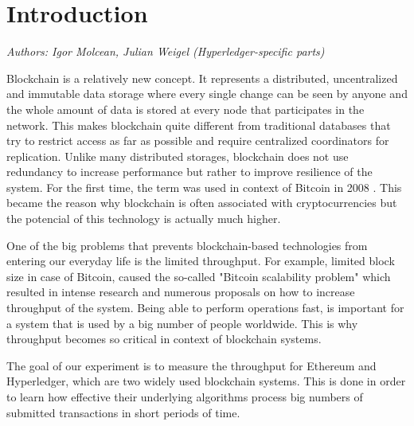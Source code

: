 \section{Introduction}
\textit{Authors: Igor Molcean, Julian Weigel (Hyperledger-specific parts)}

Blockchain is a relatively new concept. It represents a distributed, uncentralized and immutable data storage where every single change can be seen by anyone and the whole amount of data is stored at every node that participates in the network. This makes blockchain quite different from traditional databases that try to restrict access as far as possible and require centralized coordinators for replication. Unlike many distributed storages, blockchain does not use redundancy to increase performance but rather to improve resilience of the system. For the first time, the term was used in context of Bitcoin in 2008 \cite{bitcoin}. This became the reason why blockchain is often associated with cryptocurrencies but the potencial of this technology is actually much higher.

One of the big problems that prevents blockchain-based technologies from entering our everyday life is the limited throughput. For example, limited block size in case of Bitcoin, caused the so-called "Bitcoin scalability problem" which resulted in intense research \cite{bitcoin_scaling} and numerous proposals on how to increase throughput of the system. Being able to perform operations fast, is important for a system that is used by a big number of people worldwide. This is why throughput becomes so critical in context of blockchain systems.

The goal of our experiment is to measure the throughput for Ethereum and Hyperledger, which are two widely used blockchain systems. This is done in order to learn how effective their underlying algorithms process big numbers of submitted transactions in short periods of time.
